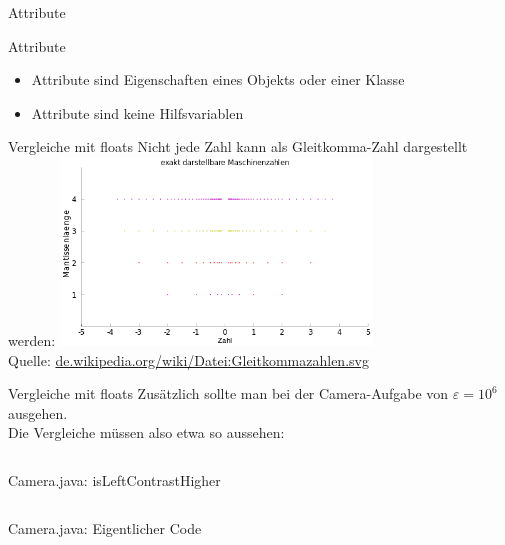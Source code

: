 \documentclass[usepdftitle=false,hyperref={pdfpagelabels=false}]{beamer}
\begin{document}
\begin{frame}{Attribute}
  \begin{alertblock}{Attribute}
    \begin{itemize}
      \item Attribute sind Eigenschaften eines Objekts oder einer Klasse
      \item Attribute sind keine Hilfsvariablen
    \end{itemize}
  \end{alertblock}
\end{frame}

\begin{frame}{Vergleiche mit floats}
    Nicht jede Zahl kann als Gleitkomma-Zahl dargestellt werden:
    \includegraphics[height=50mm]{Gleitkommazahlen.png}\\
    \tiny{Quelle: \href{http://de.wikipedia.org/wiki/Datei:Gleitkommazahlen.svg}{de.wikipedia.org/wiki/Datei:Gleitkommazahlen.svg}}\\
    

\end{frame}

\begin{frame}{Vergleiche mit floats}
    Zusätzlich sollte man bei der Camera-Aufgabe von $\varepsilon = 10^6$ ausgehen.\\
    Die Vergleiche müssen also etwa so aussehen:
    \inputminted[linenos=false, numbersep=5pt, tabsize=4, fontsize=\small, firstnumber=24, firstline=24, lastline=33]{java}{Camera.java}
\end{frame}

\begin{frame}{Camera.java: isLeftContrastHigher}
    \inputminted[linenos=true, numbersep=5pt, tabsize=4, fontsize=\tiny, firstnumber=35, firstline=35, lastline=55]{java}{Camera.java}
\end{frame}

\begin{frame}{Camera.java: Eigentlicher Code}
    \inputminted[linenos=true, numbersep=5pt, tabsize=4, fontsize=\tiny, firstnumber=57, firstline=57, lastline=87]{java}{Camera.java}
\end{frame}
\end{document}
